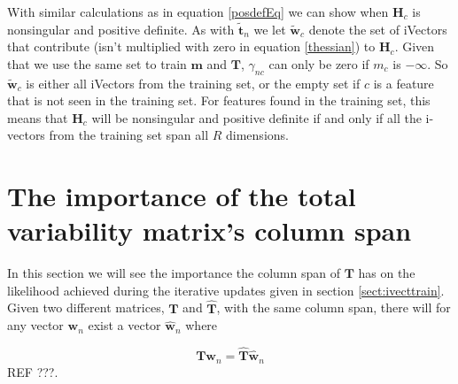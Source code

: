 With similar calculations as in equation \ref{posdefEq} we can show when $\mathbf{H}_c$ is nonsingular and positive definite. As with $\mathbf{\tilde{t}}_n$ we let $\mathbf{\tilde{w}}_c$ denote the set of iVectors that contribute (isn't multiplied with zero in equation \ref{thessian}) to $\mathbf{H}_c$. Given that we use the same set to train $\mathbf{m}$ and $\mathbf{T}$, $\gamma_{nc}$ can only be zero if $m_c$ is $-\infty$. So $\mathbf{\tilde{w}}_c$ is either all iVectors from the training set, or the empty set if $c$ is a feature that is not seen in the training set. For features found in the training set, this means that $\mathbf{H}_c$ will be nonsingular and positive definite if and only if all the i-vectors from the training set span all $R$ dimensions.

\section{The importance of the total variability matrix's column span}
\label{orthproof}

In this section we will see the importance the column span of $\mathbf{T}$ has on the likelihood achieved during the iterative updates given in section \ref{sect:ivecttrain}. Given two different matrices, $\mathbf{T}$ and $\mathbf{\hat{T}}$, with the same column span, there will for any vector $\mathbf{w}_n$ exist a vector $\mathbf{\hat{w}}_n$ where 

\begin{equation}
\label{colpropEq}
\mathbf{Tw}_n = \mathbf{\hat{T}\hat{w}}_n
\end{equation}
REF ???.
